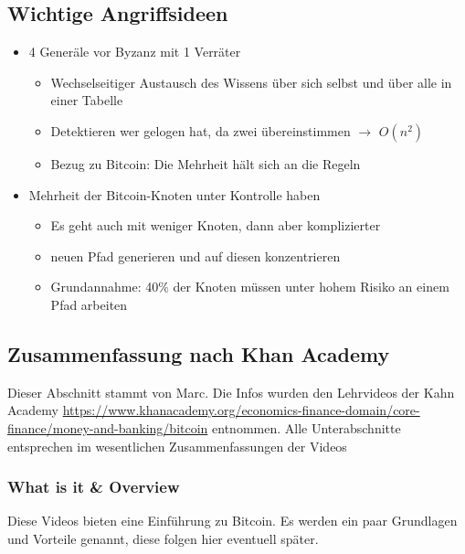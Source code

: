 \documentclass{article} %
\begin{document}
	\subsection{Wichtige Angriffsideen}
		\begin{itemize}
			\item 4 Generäle vor Byzanz mit 1 Verräter
			\begin{itemize}
				\item Wechselseitiger Austausch des Wissens über sich selbst und über alle in einer Tabelle
				\item Detektieren wer gelogen hat, da zwei übereinstimmen $\rightarrow$ $O(n^2)$
				\item Bezug zu Bitcoin: Die Mehrheit hält sich an die Regeln
			\end{itemize}
			\item Mehrheit der Bitcoin-Knoten unter Kontrolle haben
			\begin{itemize}
				\item Es geht auch mit weniger Knoten, dann aber komplizierter
				\item neuen Pfad generieren und auf diesen konzentrieren
				\item Grundannahme: 40\% der Knoten müssen unter hohem Risiko an einem Pfad arbeiten
			\end{itemize}
		\end{itemize}
	\subsection{Zusammenfassung nach Khan Academy}
	Dieser Abschnitt stammt von Marc.
	Die Infos wurden den Lehrvideos der Kahn Academy \url{https://www.khanacademy.org/economics-finance-domain/core-finance/money-and-banking/bitcoin} entnommen.
	Alle Unterabschnitte entsprechen im wesentlichen Zusammenfassungen der Videos
	\subsubsection{What is it \& Overview}
	Diese Videos bieten eine Einführung zu Bitcoin.
	Es werden ein paar Grundlagen und Vorteile genannt, diese folgen hier eventuell später.
\end{document}
